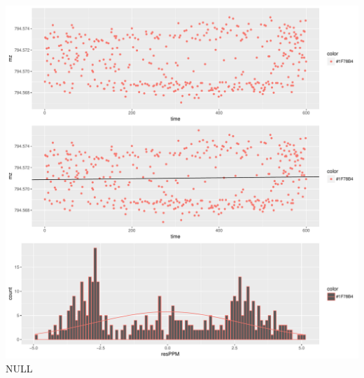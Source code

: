 \documentclass[]{article}
\begin{document}
\includegraphics{Supplementary_document_files/figure-latex/filter2.lm.794-1.pdf}
NULL
\end{document}

